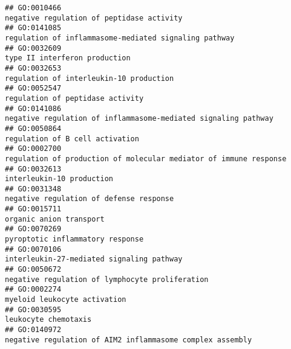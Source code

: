 \documentclass[
]{article}
\begin{document}
\begin{verbatim}
## GO:0010466                                                                                                        negative regulation of peptidase activity
## GO:0141085                                                                                            regulation of inflammasome-mediated signaling pathway
## GO:0032609                                                                                                                    type II interferon production
## GO:0032653                                                                                                          regulation of interleukin-10 production
## GO:0052547                                                                                                                 regulation of peptidase activity
## GO:0141086                                                                                   negative regulation of inflammasome-mediated signaling pathway
## GO:0050864                                                                                                                  regulation of B cell activation
## GO:0002700                                                                                regulation of production of molecular mediator of immune response
## GO:0032613                                                                                                                        interleukin-10 production
## GO:0031348                                                                                                          negative regulation of defense response
## GO:0015711                                                                                                                          organic anion transport
## GO:0070269                                                                                                                 pyroptotic inflammatory response
## GO:0070106                                                                                                        interleukin-27-mediated signaling pathway
## GO:0050672                                                                                                  negative regulation of lymphocyte proliferation
## GO:0002274                                                                                                                     myeloid leukocyte activation
## GO:0030595                                                                                                                             leukocyte chemotaxis
## GO:0140972                                                                                        negative regulation of AIM2 inflammasome complex assembly

\end{verbatim}
\end{document}
